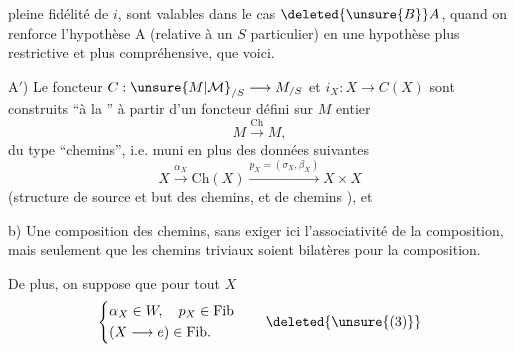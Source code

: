 pleine fidélité de $i$, sont valables dans le cas $\deleted{\unsure{B}}A$, quand on renforce l'hypothèse A (relative à un $S$ particulier) en une hypothèse plus restrictive et plus compréhensive, que voici.

A$'$) Le foncteur $C:\unsure{M|\mathcal M}_{/S}\longrightarrow M_{/S}$ et     $i_X:X\longrightarrow C(X)$ sont construits ``à la '' à partir d'un foncteur défini sur $M$  entier
\[
M\xrightarrow{\mathrm{Ch}}M,
\]
du type ``chemins'', i.e. muni en plus des données suivantes
\[
X\xrightarrow{\alpha_X}\mathrm{Ch}(X)\xrightarrow{p_X=(\sigma_X,\beta_X)}X\times X\tag*{a)}
\]
(structure de source et but des chemins, et de chemins ), et

b) Une composition des chemins, sans exiger ici l'associativité de la composition, mais seulement que les chemins triviaux soient  bilatères pour la composition.

De plus, on suppose que pour tout $X$
\[
\left\{\begin{aligned}
&\alpha_X\in W,\quad p_X\in\mathrm{Fib}\\
&(X\longrightarrow e)\in\mathrm{Fib}.
\end{aligned}\right.\tag*{\deleted{\unsure{(3)}}}
\]
